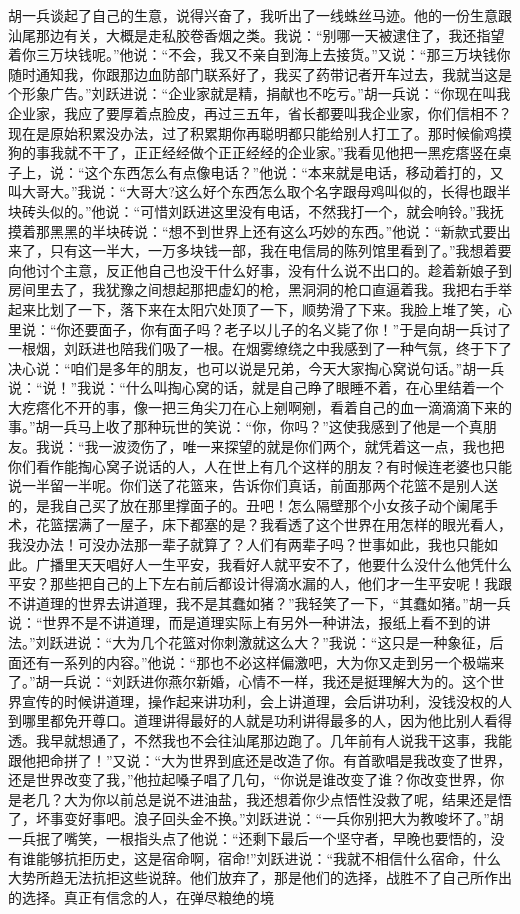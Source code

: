 \documentclass[12pt,oneside]{book}
\begin{document}
胡一兵谈起了自己的生意，说得兴奋了，我听出了一线蛛丝马迹。他的一份生意跟汕尾那边有关，大概是走私胶卷香烟之类。我说：``别哪一天被逮住了，我还指望着你三万块钱呢。''他说：``不会，我又不亲自到海上去接货。''又说：``那三万块钱你随时通知我，你跟那边血防部门联系好了，我买了药带记者开车过去，我就当这是个形象广告。''刘跃进说：``企业家就是精，捐献也不吃亏。''胡一兵说：``你现在叫我企业家，我应了要厚着点脸皮，再过三五年，省长都要叫我企业家，你们信相不？现在是原始积累没办法，过了积累期你再聪明都只能给别人打工了。那时候偷鸡摸狗的事我就不干了，正正经经做个正正经经的企业家。''我看见他把一黑疙瘩竖在桌子上，说：``这个东西怎么有点像电话？''他说：``本来就是电话，移动着打的，又叫大哥大。''我说：``大哥大?这么好个东西怎么取个名字跟母鸡叫似的，长得也跟半块砖头似的。''他说：``可惜刘跃进这里没有电话，不然我打一个，就会响铃。''我抚摸着那黑黑的半块砖说：``想不到世界上还有这么巧妙的东西。''他说：``新款式要出来了，只有这一半大，一万多块钱一部，我在电信局的陈列馆里看到了。''我想着要向他讨个主意，反正他自己也没干什么好事，没有什么说不出口的。趁着新娘子到房间里去了，我犹豫之间想起那把虚幻的枪，黑洞洞的枪口直逼着我。我把右手举起来比划了一下，落下来在太阳穴处顶了一下，顺势滑了下来。我脸上堆了笑，心里说：``你还要面子，你有面子吗？老子以儿子的名义毙了你！''于是向胡一兵讨了一根烟，刘跃进也陪我们吸了一根。在烟雾缭绕之中我感到了一种气氛，终于下了决心说：``咱们是多年的朋友，也可以说是兄弟，今天大家掏心窝说句话。''胡一兵说：``说！''我说：``什么叫掏心窝的话，就是自己睁了眼睡不着，在心里结着一个大疙瘩化不开的事，像一把三角尖刀在心上剜啊剜，看着自己的血一滴滴滴下来的事。''胡一兵马上收了那种玩世的笑说：``你，你吗？''这使我感到了他是一个真朋友。我说：``我一波烫伤了，唯一来探望的就是你们两个，就凭着这一点，我也把你们看作能掏心窝子说话的人，人在世上有几个这样的朋友？有时候连老婆也只能说一半留一半呢。你们送了花篮来，告诉你们真话，前面那两个花篮不是别人送的，是我自己买了放在那里撑面子的。丑吧！怎么隔壁那个小女孩子动个阑尾手术，花篮摆满了一屋子，床下都塞的是？我看透了这个世界在用怎样的眼光看人，我没办法！可没办法那一辈子就算了？人们有两辈子吗？世事如此，我也只能如此。广播里天天唱好人一生平安，我看好人就平安不了，他要什么没什么他凭什么平安？那些把自己的上下左右前后都设计得滴水漏的人，他们才一生平安呢！我跟不讲道理的世界去讲道理，我不是其蠢如猪？''我轻笑了一下，``其蠢如猪。''胡一兵说：``世界不是不讲道理，而是道理实际上有另外一种讲法，报纸上看不到的讲法。''刘跃进说：``大为几个花篮对你刺激就这么大？''我说：``这只是一种象征，后面还有一系列的内容。''他说：``那也不必这样偏激吧，大为你又走到另一个极端来了。''胡一兵说：``刘跃进你燕尔新婚，心情不一样，我还是挺理解大为的。这个世界宣传的时候讲道理，操作起来讲功利，会上讲道理，会后讲功利，没钱没权的人到哪里都免开尊口。道理讲得最好的人就是功利讲得最多的人，因为他比别人看得透。我早就想通了，不然我也不会往汕尾那边跑了。几年前有人说我干这事，我能跟他把命拼了！''又说：``大为世界到底还是改造了你。有首歌唱是我改变了世界，还是世界改变了我，''他拉起嗓子唱了几句，``你说是谁改变了谁？你改变世界，你是老几？大为你以前总是说不进油盐，我还想着你少点悟性没救了呢，结果还是悟了，坏事变好事吧。浪子回头金不换。''刘跃进说：``一兵你别把大为教唆坏了。''胡一兵抿了嘴笑，一根指头点了他说：``还剩下最后一个坚守者，早晚也要悟的，没有谁能够抗拒历史，这是宿命啊，宿命!''刘跃进说：``我就不相信什么宿命，什么大势所趋无法抗拒这些说辞。他们放弃了，那是他们的选择，战胜不了自己所作出的选择。真正有信念的人，在弹尽粮绝的境
\end{document}
